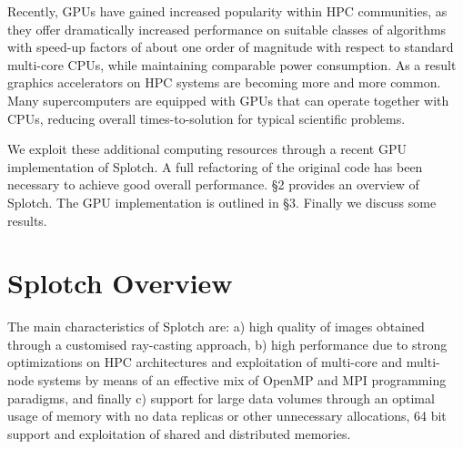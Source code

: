 Recently, GPUs have gained increased popularity within HPC communities, as they offer dramatically increased performance on suitable classes of algorithms with speed-up factors of about one order of magnitude with respect to standard multi-core CPUs, while maintaining comparable power consumption. As a result graphics accelerators on HPC systems are becoming more and more common. Many supercomputers are equipped with GPUs that can operate together with CPUs, reducing overall times-to-solution for typical scientific problems.

We exploit these additional computing resources through a recent GPU implementation of Splotch. A full refactoring of the original code has been necessary to achieve good overall performance. \S 2 provides an overview of Splotch. The GPU implementation is outlined in \S 3. Finally we discuss some results.

\section{Splotch Overview}

The main characteristics of Splotch are: a) high quality of images obtained through a customised ray-casting approach, b) high performance due to strong optimizations on HPC architectures and exploitation of multi-core and multi-node systems by means of an effective mix of OpenMP and MPI programming paradigms, and finally c) support for large data volumes through an optimal usage of memory with no data replicas or other unnecessary allocations, 64 bit support and exploitation of shared and distributed memories.

